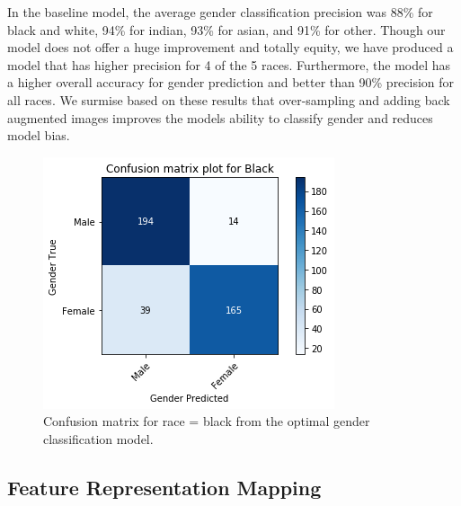 \documentclass[obeyspaces, spaces, fleqn,10pt]{SelfArx} %
\begin{document}
\noindent In the baseline model, the average gender classification precision was 88\% for black and white, 94\% for indian, 93\% for asian, and 91\% for other. Though our model does not offer a huge improvement and totally equity, we have produced a model that has higher precision for 4 of the 5 races. Furthermore, the model has a higher overall accuracy for gender prediction and better than 90\% precision for all races. We surmise based on these results that over-sampling and adding back augmented images improves the models ability to classify gender and reduces model bias.

\begin{figure}[ht]\centering %
\includegraphics[width=.95\linewidth]{img/confmat_black}
\caption{Confusion matrix for race = black from the optimal gender classification model.}
\label{fig:fig6}
\end{figure}


\subsection{Feature Representation Mapping}
\end{document}
